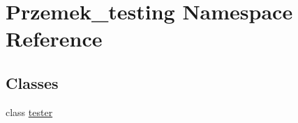 \hypertarget{namespace_przemek__testing}{\section{Przemek\-\_\-testing Namespace Reference}
\label{namespace_przemek__testing}
}
\subsection*{Classes}
\begin{DoxyCompactItemize}
\item 
class \hyperlink{class_przemek__testing_1_1tester}{tester}
\end{DoxyCompactItemize}
